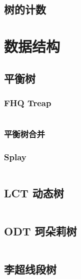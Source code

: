 \documentclass[12pt, a4paper, oneside]{ctexart}
\begin{document}
\begin{multicols}{2}
        \subsection{树的计数}
        
        \newpage

        \section{数据结构}
        \subsection{平衡树}
        \subsubsection{FHQ Treap}
        \inputminted{cpp}{src/data structure/fhq.cpp}
        \subsubsection{平衡树合并}
        
        \subsubsection{Splay}
        \inputminted{cpp}{src/data structure/splay.cpp}
        \subsection{LCT 动态树}
        \inputminted{cpp}{src/data structure/LCT.cpp}
        \subsection{ODT 珂朵莉树}
        \inputminted{cpp}{src/data structure/ODT.cpp}
        \subsection{李超线段树}
        

\end{multicols}
\end{document}
